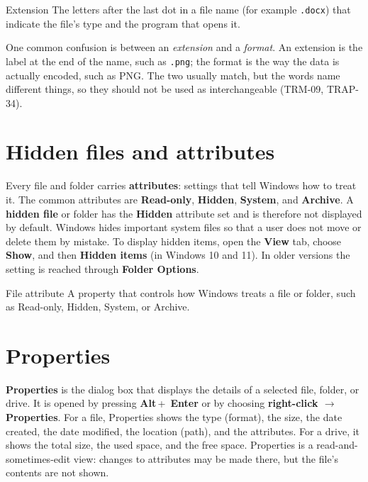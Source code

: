 \begin{definitionbox}{Extension}
The letters after the last dot in a file name (for example \texttt{.docx})
that indicate the file's type and the program that opens it.
\end{definitionbox}

One common confusion is between an \emph{extension} and a \emph{format}. An
extension is the label at the end of the name, such as \texttt{.png}; the
format is the way the data is actually encoded, such as PNG. The two usually
match, but the words name different things, so they should not be used as
interchangeable (TRM-09, TRAP-34).

\section{Hidden files and attributes}
Every file and folder carries \textbf{attributes}: settings that tell Windows
how to treat it. The common attributes are \textbf{Read-only}, \textbf{Hidden},
\textbf{System}, and \textbf{Archive}. A \textbf{hidden file} or folder has
the \textbf{Hidden} attribute set and is therefore not displayed by default.
Windows hides important system files so that a user does not move or delete
them by mistake. To display hidden items, open the \textbf{View} tab, choose
\textbf{Show}, and then \textbf{Hidden items} (in Windows 10 and 11). In older
versions the setting is reached through \textbf{Folder Options}.

\begin{definitionbox}{File attribute}
A property that controls how Windows treats a file or folder, such as
Read-only, Hidden, System, or Archive.
\end{definitionbox}

\section{Properties}
\textbf{Properties} is the dialog box that displays the details of a selected
file, folder, or drive. It is opened by pressing \textbf{Alt}\,+\,
\textbf{Enter} or by choosing \textbf{right-click $\rightarrow$ Properties}.
For a file, Properties shows the type (format), the size, the date created,
the date modified, the location (path), and the attributes. For a drive, it
shows the total size, the used space, and the free space. Properties is a
read-and-sometimes-edit view: changes to attributes may be made there, but
the file's contents are not shown.

